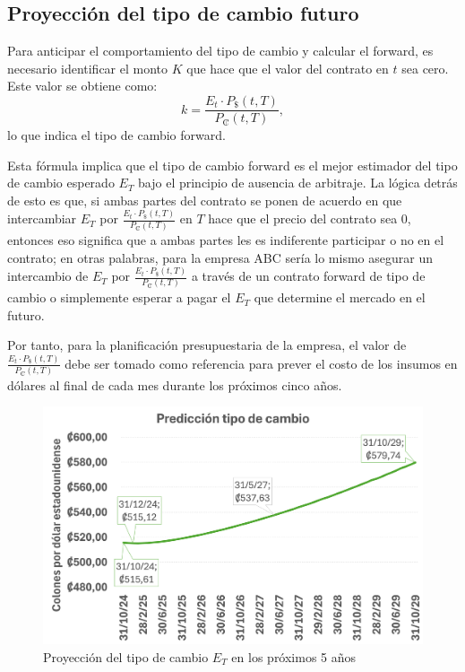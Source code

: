 \documentclass[12pt]{article}
\begin{document}
\subsection*{Proyección del tipo de cambio futuro}

Para anticipar el comportamiento del tipo de cambio y calcular el forward, es necesario identificar el monto \( K \) que hace que el valor del contrato en \( t \) sea cero. Este valor se obtiene como:
\[
k = \frac{E_t \cdot P_{\text{\$}}(t, T)}{P_{\text{₡}}(t, T)},
\]
lo que indica el tipo de cambio forward.

Esta fórmula implica que el tipo de cambio forward es el mejor estimador del tipo de cambio esperado \( E_T \) bajo el principio de ausencia de arbitraje. La lógica detrás de esto es que, si ambas partes del contrato se ponen de acuerdo en que intercambiar \( E_T \) por $\frac{E_t \cdot P_{\text{\$}}(t, T)}{P_{\text{₡}}(t, T)}$ en \( T \) hace que el precio del contrato sea 0, entonces eso significa que a ambas partes les es indiferente participar o no en el contrato; en otras palabras, para la empresa ABC sería lo mismo asegurar un intercambio de \( E_T \) por $\frac{E_t \cdot P_{\text{\$}}(t, T)}{P_{\text{₡}}(t, T)}$ a través de un contrato forward de tipo de cambio o simplemente esperar a pagar el \( E_T \) que determine el mercado en el futuro. 

Por tanto, para la planificación presupuestaria de la empresa, el valor de $\frac{E_t \cdot P_{\text{\$}}(t, T)}{P_{\text{₡}}(t, T)}$ debe ser tomado como referencia para prever el costo de los insumos en dólares al final de cada mes durante los próximos cinco años.
\begin{figure}[H]
    \centering
    \includegraphics[width=1\linewidth]{grafico_tipo_de_cambio.png}
    \caption{Proyección del tipo de cambio \( E_T \) en los próximos 5 años}
    \label{fig:enter-label}
\end{figure}
\end{document}
